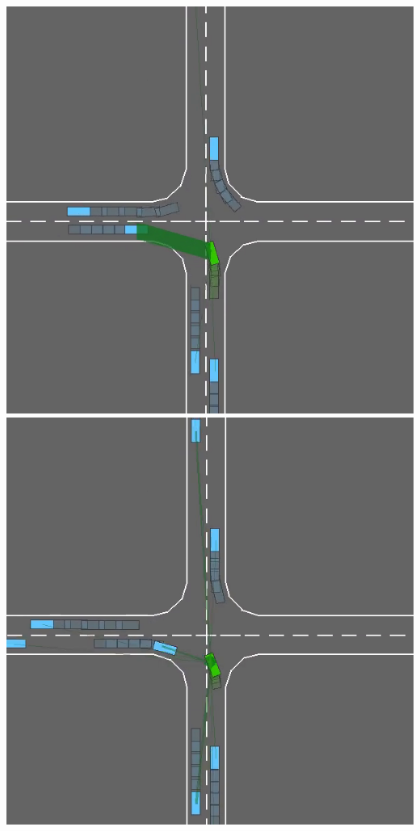 \documentclass[a0paper,portrait,fontscale=0.3, margin=2cm]{baposter}
\begin{document}
\begin{poster}
{\begin{center}
\begin{minipage}[b]{0.28\textwidth}
\end{minipage}
\begin{minipage}[b]{0.42\textwidth}
	\includegraphics[width=0.49\linewidth]{../img/watch1}
	\includegraphics[width=0.49\linewidth]{../img/watch2}
\end{minipage}


\end{center}}
\end{poster}
\end{document}
